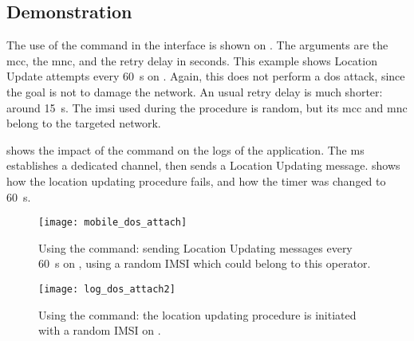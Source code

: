       \subsection{Demonstration}

      The use of the  command in the 
      interface is shown on . The arguments
      are the \gls{mcc}, the \gls{mnc}, and the retry delay in seconds.
      This example shows Location Update attempts every \SI{60}{\second}
      on . Again, this does not perform a \gls{dos} attack,
      since the goal is not to damage the network. An usual retry delay
      is much shorter: around \SI{15}{\second}. The \gls{imsi} used during
      the procedure is random, but its \gls{mcc} and \gls{mnc} belong to
      the targeted network. 

       shows the impact of the command on the
      logs of the  application. The \gls{ms} establishes a
      dedicated channel, then sends a Location Updating message.
       shows how the location updating
      procedure fails, and how the timer was changed to
      \SI{60}{\second}.

      \begin{figure}[p]
        \centering
        \texttt{[image: mobile\_dos\_attach]}
        \caption{Using the  command: sending Location
        Updating messages every \SI{60}{\second} on , using
      a random IMSI which could belong to this operator.}
        \label{fig:mobile_dos_attach}
      \end{figure}

      \iffalse
      \begin{figure}[p]
        \centering
        \texttt{[image: log\_dos\_attach]}
        \caption{Using the \prog{dos attach} to send a Location Updating
          Request with a random IMSI to \comp{Netcom} using Wireshark.}
        \label{fig:log_dos_attach}
      \end{figure}
      \fi

      \begin{figure}[p]
        \centering
        \texttt{[image: log\_dos\_attach2]}
        \caption{Using the  command: the location
        updating procedure is initiated with a random IMSI on
      .}
        \label{fig:log_dos_attach2}
      \end{figure}

